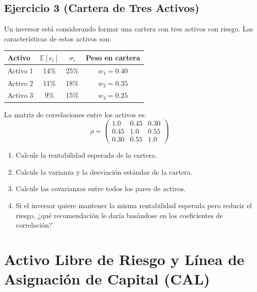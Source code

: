 \documentclass[12pt,a4paper]{article}
\newcommand{\E}{\mathbb{E}}
\newenvironment{ejercicio}[1]{\subsection*{Ejercicio #1}}{}
\begin{document}
\begin{ejercicio}{3 (Cartera de Tres Activos)}
Un inversor está considerando formar una cartera con tres activos con riesgo. Las características de estos activos son:
\begin{center}
\begin{tabular}{lccc}
\toprule
Activo & $\E[r_i]$ & $\sigma_i$ & Peso en cartera \\
\midrule
Activo 1 & 14\% & 25\% & $w_1 = 0.40$ \\
Activo 2 & 11\% & 18\% & $w_2 = 0.35$ \\
Activo 3 & 9\% & 15\% & $w_3 = 0.25$ \\
\bottomrule
\end{tabular}
\end{center}

La matriz de correlaciones entre los activos es:
\[
\rho = \begin{pmatrix}
1.0 & 0.45 & 0.30 \\
0.45 & 1.0 & 0.55 \\
0.30 & 0.55 & 1.0
\end{pmatrix}
\]

\begin{enumerate}[label=\alph*)]
  \item Calcule la rentabilidad esperada de la cartera.
  \item Calcule la varianza y la desviación estándar de la cartera.
  \item Calcule las covarianzas entre todos los pares de activos.
  \item Si el inversor quiere mantener la misma rentabilidad esperada pero reducir el riesgo, ¿qué recomendación le daría basándose en los coeficientes de correlación?
\end{enumerate}
\end{ejercicio}

\section{Activo Libre de Riesgo y Línea de Asignación de Capital (CAL)}
\end{document}
